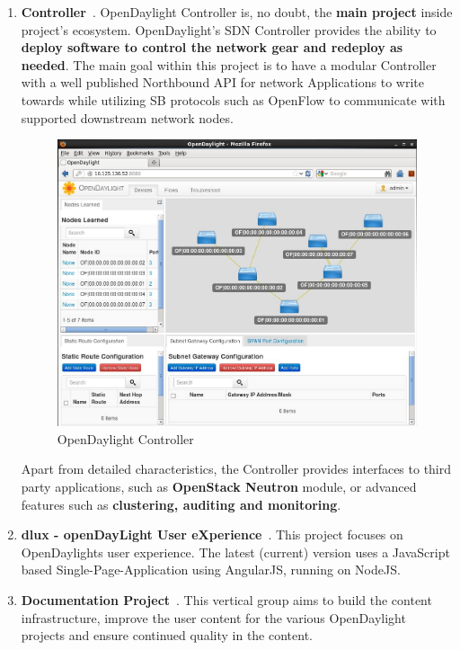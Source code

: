 \documentclass[a4paper, 12pt]{book}
\begin{document}
\begin{enumerate}
\item{\textbf{Controller}}~\cite{OpenDaylightWikiController}. OpenDaylight Controller is, no doubt, the \textbf{main project} inside project's ecosystem. OpenDaylight's SDN Controller provides the ability to \textbf{deploy software to control the network gear and redeploy as needed}. The main goal within this project is to have a modular Controller with a well published Northbound API for network Applications to write towards while utilizing SB protocols such as OpenFlow to communicate with supported downstream network nodes.
\begin{center}
 \begin{figure}[H]
 \begin{center}
   \includegraphics[width=15cm]{img/odl-controller-00.png}
   \caption{OpenDaylight Controller}
   \label{fig:odl_tech_diagram}
 \end{center}
 \end{figure}
\end{center}
Apart from detailed characteristics, the Controller provides interfaces to third party applications, such as \textbf{OpenStack Neutron} module, or advanced features such as \textbf{clustering, auditing and monitoring}.
\item{\textbf{dlux - openDayLight User eXperience}}~\cite{OpenDaylightWikiDlux}. This project focuses on OpenDaylights user experience. The latest (current) version uses a JavaScript based Single-Page-Application using AngularJS, running on NodeJS.
\item{\textbf{Documentation Project}}~\cite{OpenDaylightWikiDoc}. This vertical group aims to build the content infrastructure, improve the user content for the various OpenDaylight projects and ensure continued quality in the content.

\end{enumerate}
\end{document}
